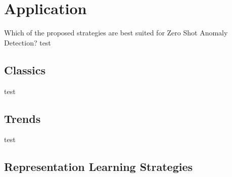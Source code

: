 \chapter{Application}
 Which of the proposed strategies are best suited for Zero Shot Anomaly Detection?
test
\section{Classics}
test
\section{Trends}
test
\section{Representation Learning Strategies}